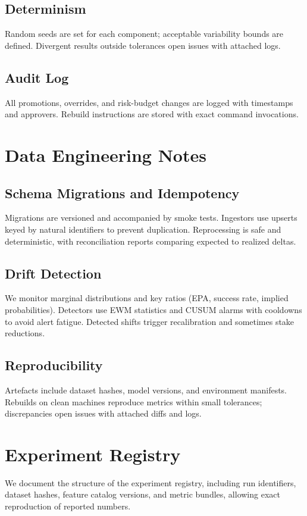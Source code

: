 \subsection{Determinism}
Random seeds are set for each component; acceptable variability bounds are defined. Divergent results outside tolerances open issues with attached logs.

\subsection{Audit Log}
All promotions, overrides, and risk-budget changes are logged with timestamps and approvers. Rebuild instructions are stored with exact command invocations.

\section{Data Engineering Notes}\label{app:data-eng}

\subsection{Schema Migrations and Idempotency}
Migrations are versioned and accompanied by smoke tests. Ingestors use upserts keyed by natural identifiers to prevent duplication. Reprocessing is safe and deterministic, with reconciliation reports comparing expected to realized deltas.

\subsection{Drift Detection}
We monitor marginal distributions and key ratios (EPA, success rate, implied probabilities). Detectors use EWM statistics and CUSUM alarms with cooldowns to avoid alert fatigue. Detected shifts trigger recalibration and sometimes stake reductions.

\subsection{Reproducibility}
Artefacts include dataset hashes, model versions, and environment manifests. Rebuilds on clean machines reproduce metrics within small tolerances; discrepancies open issues with attached diffs and logs.

\section{Experiment Registry}\label{app:experiment-registry}
We document the structure of the experiment registry, including run identifiers, dataset hashes, feature catalog versions, and metric bundles, allowing exact reproduction of reported numbers.

